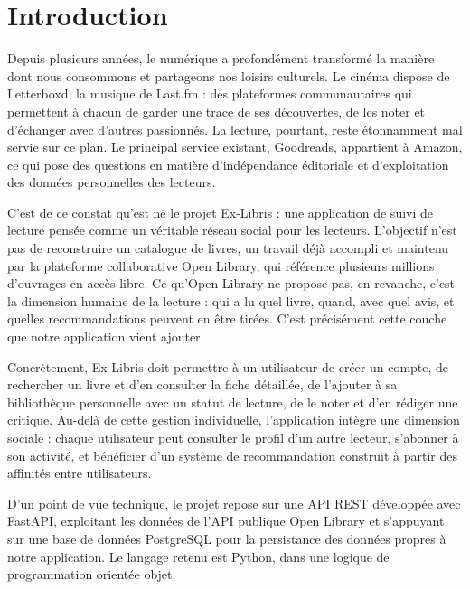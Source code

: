 \documentclass[
  letterpaper,
  DIV=11,
  numbers=noendperiod]{scrartcl}
\author{}
\date{}
\renewcommand*\contentsname{Table of contents}
\newcommand\contentsname{Table of contents}
\begin{document}

\clearpage

\renewcommand*\contentsname{Table des matières}
{
\setcounter{tocdepth}{3}
\tableofcontents
}

\newpage

\section{Introduction}\label{introduction}

Depuis plusieurs années, le numérique a profondément transformé la
manière dont nous consommons et partageons nos loisirs culturels. Le
cinéma dispose de Letterboxd, la musique de Last.fm : des plateformes
communautaires qui permettent à chacun de garder une trace de ses
découvertes, de les noter et d'échanger avec d'autres passionnés. La
lecture, pourtant, reste étonnamment mal servie sur ce plan. Le
principal service existant, Goodreads, appartient à Amazon, ce qui pose
des questions en matière d'indépendance éditoriale et d'exploitation des
données personnelles des lecteurs.

C'est de ce constat qu'est né le projet Ex-Libris : une application de
suivi de lecture pensée comme un véritable réseau social pour les
lecteurs. L'objectif n'est pas de reconstruire un catalogue de livres,
un travail déjà accompli et maintenu par la plateforme collaborative
Open Library, qui référence plusieurs millions d'ouvrages en accès
libre. Ce qu'Open Library ne propose pas, en revanche, c'est la
dimension humaine de la lecture : qui a lu quel livre, quand, avec quel
avis, et quelles recommandations peuvent en être tirées. C'est
précisément cette couche que notre application vient ajouter.

Concrètement, Ex-Libris doit permettre à un utilisateur de créer un
compte, de rechercher un livre et d'en consulter la fiche détaillée, de
l'ajouter à sa bibliothèque personnelle avec un statut de lecture, de le
noter et d'en rédiger une critique. Au-delà de cette gestion
individuelle, l'application intègre une dimension sociale : chaque
utilisateur peut consulter le profil d'un autre lecteur, s'abonner à son
activité, et bénéficier d'un système de recommandation construit à
partir des affinités entre utilisateurs.

D'un point de vue technique, le projet repose sur une API REST
développée avec FastAPI, exploitant les données de l'API publique Open
Library et s'appuyant sur une base de données PostgreSQL pour la
persistance des données propres à notre application. Le langage retenu
est Python, dans une logique de programmation orientée objet.
\end{document}
